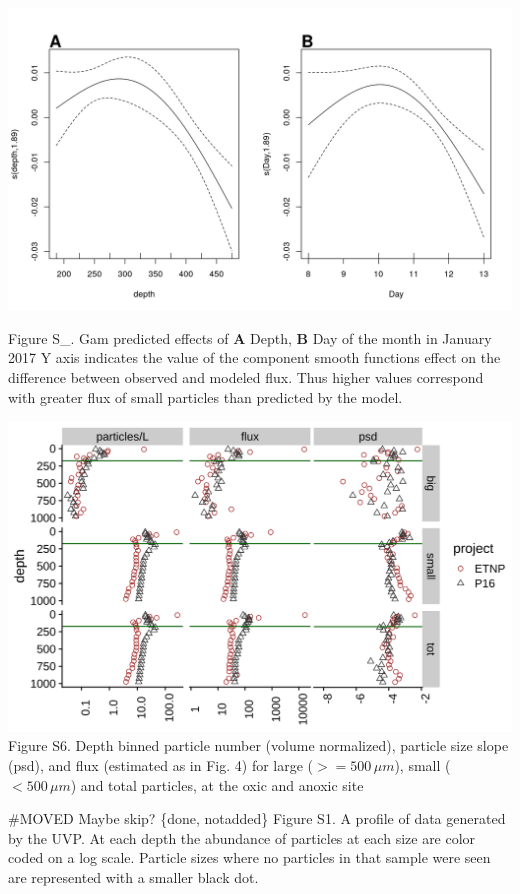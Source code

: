 \documentclass[]{article}
\begin{document}
\includegraphics{../figures/OSMSGamPlot.png}

Figure S\_. Gam predicted effects of \textbf{A} Depth, \textbf{B} Day of
the month in January 2017 Y axis indicates the value of the component
smooth functions effect on the difference between observed and modeled
flux. Thus higher values correspond with greater flux of small particles
than predicted by the model.

\includegraphics{../figures/BigVsSmall.svg} Figure S6. Depth binned
particle number (volume normalized), particle size slope (psd), and flux
(estimated as in Fig. 4) for large (\(>= 500\, \mu m\)), small
(\(< 500 \, \mu m\)) and total particles, at the oxic and anoxic site

\#MOVED Maybe skip? \{done, notadded\} Figure S1. A profile of data
generated by the UVP. At each depth the abundance of particles at each
size are color coded on a log scale. Particle sizes where no particles
in that sample were seen are represented with a smaller black dot.
\end{document}

